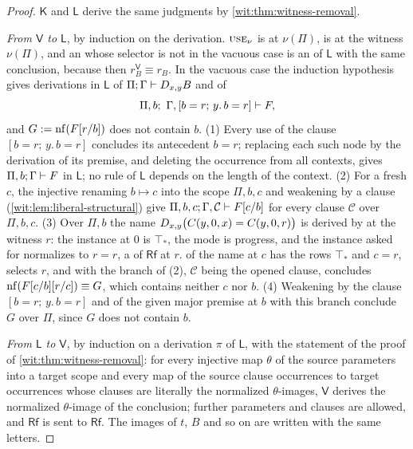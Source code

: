 \begin{proof}
$\mathsf K$ and $\mathsf L$ derive the same judgments by
\cref{wit:thm:witness-removal}.

\emph{From $\mathsf V$ to $\mathsf L$}, by induction on the derivation.
$\rulename{Use}_\nu$ is  at $\nu(\Pi)$,  is
 at the witness $\nu(\Pi)$, and an  whose
selector is not in the vacuous case is an  of $\mathsf L$
with the same conclusion, because then $r^{\mathsf V}_B\equiv r_B$.  In the
vacuous case the induction hypothesis gives derivations in $\mathsf L$ of
$\Pi;\Gamma\vdash D_{x,y}B$ and of
\[
 \Pi,b;\ \Gamma,[b=r;\,y.\,b=r]\vdash F,
\]
and $G\mathrel{:=}\operatorname{nf}(F[r/b])$ does not contain $b$.  (1) Every use of the
clause $[b=r;\,y.\,b=r]$ concludes its antecedent $b=r$; replacing each such
node by the derivation of its premise, and deleting the occurrence from all
contexts, gives $\Pi,b;\Gamma\vdash F$ in $\mathsf L$; no rule of
$\mathsf L$ depends on the length of the context.  (2) For a fresh $c$, the
injective renaming $b\mapsto c$ into the scope $\Pi,b,c$ and weakening by a
clause (\cref{wit:lem:liberal-structural}) give
$\Pi,b,c;\Gamma,\mathcal{C}\vdash F[c/b]$ for every clause
$\mathcal C$ over $\Pi,b,c$.  (3) Over $\Pi,b$ the name
$D_{x,y}\bigl(C(y,0,x)=C(y,0,r)\bigr)$ is derived by  at the
witness $r$: the instance at $0$ is $\top_{*}$, the mode is progress, and
the instance asked for normalizes to $r=r$, a  of
$\mathsf{Rf}$ at $r$.   of the name at $c$ has the rows
$\top_{*}$ and $c=r$, selects $r$, and with the branch of (2), $\mathcal C$
being the opened clause, concludes
$\operatorname{nf}(F[c/b][r/c])\equiv G$, which contains neither $c$ nor
$b$.  (4) Weakening by the clause $[b=r;\,y.\,b=r]$ and  of
the given major premise at $b$ with this branch conclude $G$ over $\Pi$,
since $G$ does not contain $b$.

\emph{From $\mathsf L$ to $\mathsf V$}, by induction on a derivation $\pi$
of $\mathsf L$, with the statement of the proof of
\cref{wit:thm:witness-removal}: for every injective map $\theta$ of the
source parameters into a target scope and every map of the source clause
occurrences to target occurrences whose clauses are literally the
normalized $\theta$-images, $\mathsf V$ derives the normalized
$\theta$-image of the conclusion; further parameters and clauses are
allowed, and $\mathsf{Rf}$ is sent to $\mathsf{Rf}$.  The images of $t$, $B$
and so on are written with the same letters.


\end{proof}
